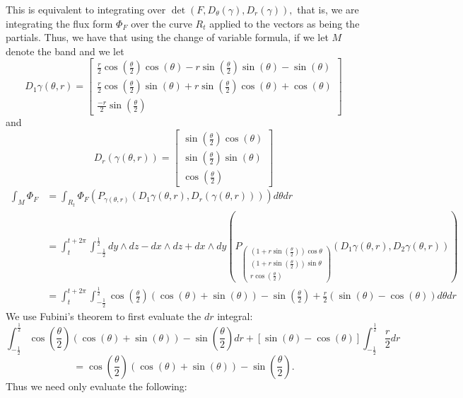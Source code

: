 \documentclass[11pt]{article}
\begin{document}
\begin{solution}
    This is equivalent to integrating over $\det(F, D_\theta(\gamma), D_r(\gamma)),$ that is, we are integrating the flux form $\Phi_{F}$ over the curve $R_t$ applied to the vectors as being the partials. Thus, we have that using the change of variable formula, if we let $M$ denote the band and we let 
    \[D_1\gamma(\theta, r) = \begin{bmatrix}
        \frac{r}{2}\cos(\frac{\theta}{2})\cos(\theta) - r\sin(\frac{\theta}{2})\sin(\theta) - \sin(\theta)\\
        \frac{r}{2}\cos(\frac{\theta}{2})\sin(\theta) + r\sin(\frac{\theta}{2})\cos(\theta) + \cos(\theta)\\
        \frac{-r}{2}\sin(\frac{\theta}{2})
    \end{bmatrix}\] and 
    \[D_r(\gamma(\theta, r)) = \begin{bmatrix}
        \sin(\frac{\theta}{2})\cos(\theta)\\\sin(\frac{\theta}{2})\sin(\theta)\\\cos(\frac{\theta}{2})
    \end{bmatrix}\]
    \begin{align*}
    \int_M \Phi_F &= \int_{R_t} \Phi_F\left(P_{\gamma(\theta,r)} (D_1\gamma(\theta, r), D_r(\gamma(\theta, r)))\right) d\theta dr\\
    &= \int_t^{t + 2\pi}\int_{-\frac{1}{2}}^\frac{1}{2} dy \wedge dz - dx \wedge dz + dx \wedge dy \left(P_{\begin{pmatrix}
    (1 + r\sin(\frac{\theta}{2}))\cos\theta\\
    (1 + r\sin(\frac{\theta}{2}))\sin\theta\\
    r\cos(\frac{\theta}{2})
\end{pmatrix}}\left( D_1\gamma(\theta, r), D_2\gamma(\theta, r)
\right)\right)\\
&= \int_t^{t + 2\pi}\int_{-\frac{1}{2}}^\frac{1}{2} \cos(\frac{\theta}{2})(\cos(\theta) + \sin(\theta)) - \sin(\frac{\theta}{2}) + \frac{r}{2}(\sin(\theta) -\cos(\theta))d\theta dr
    \end{align*}
We use Fubini's theorem to first evaluate the $dr$ integral:
\[\int_{-\frac{1}{2}}^\frac{1}{2}\cos(\frac{\theta}{2})(\cos(\theta) + \sin(\theta)) - \sin(\frac{\theta}{2})dr + [\sin(\theta) - \cos(\theta)]\int_{-\frac{1}{2}}^\frac{1}{2}\frac{r}{2}dr\]
\[= \cos(\frac{\theta}{2})(\cos(\theta) + \sin(\theta)) - \sin(\frac{\theta}{2}).\]
Thus we need only evaluate the following:
\begin{align*}

\end{align*}
\end{solution}
\end{document}
